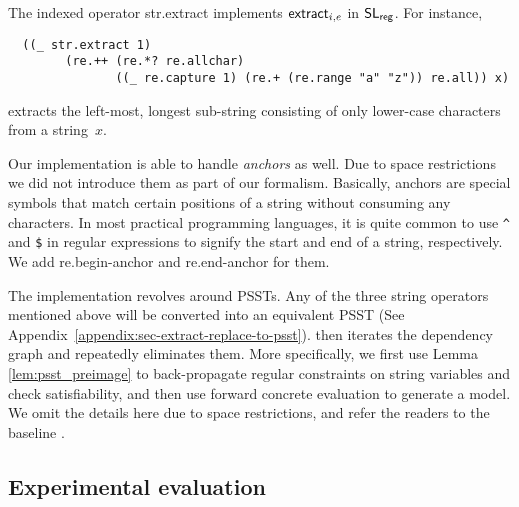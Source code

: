 The indexed operator {\sf str.extract} implements $\mathsf{extract}_{i, e}$ in
$\mathsf{SL}_{\sf reg}$. For instance,
%
{\small
\begin{verbatim}
  ((_ str.extract 1)
        (re.++ (re.*? re.allchar)
               ((_ re.capture 1) (re.+ (re.range "a" "z")) re.all)) x)
\end{verbatim}
}
extracts the left-most, longest sub-string consisting of only lower-case
characters from a string~$x$.

Our implementation is able to handle \textit{anchors} as well. Due to space restrictions we did not introduce them as part of our formalism. Basically, anchors are special symbols that match certain positions of a string without consuming any characters. In most practical programming languages, it is quite common to use \verb!^! and \verb!$! in regular expressions to signify the start and end of a string, respectively. We add \textsf{re.begin-anchor} and \textsf{re.end-anchor} for them.

The implementation revolves around PSSTs. Any of the three string operators mentioned above will be converted into an equivalent PSST (See Appendix~\ref{appendix:sec-extract-replace-to-psst}). {\ostrich} then iterates the dependency graph and repeatedly eliminates them. More specifically, we first use Lemma \ref{lem:psst_preimage} to back-propagate regular constraints on string variables and check satisfiability, and then use forward concrete evaluation to generate a model. We omit the details here due to space restrictions, and refer the readers to the baseline \cite{CHL+19}.

\subsection{Experimental evaluation}


